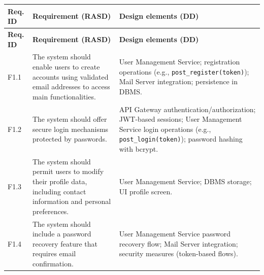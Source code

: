 \small
\begin{longtable}{|p{}|p{}|p{}|}
    \hline
    \textbf{Req. ID} & \textbf{Requirement (RASD)} & \textbf{Design elements (DD)} \\
    \hline
    \endfirsthead
    \hline
    \textbf{Req. ID} & \textbf{Requirement (RASD)} & \textbf{Design elements (DD)} \\
    \hline
    \endhead
    \hline
    \endfoot

    F1.1 & The system should enable users to create accounts using validated email addresses to access main functionalities. &
    User Management Service; registration operations (e.g., \texttt{post\_register(token)}); Mail Server integration; persistence in DBMS. \\
    \hline
    F1.2 & The system should offer secure login mechanisms protected by passwords. &
    API Gateway authentication/authorization; JWT-based sessions; User Management Service login operations (e.g., \texttt{post\_login(token)}); password hashing with bcrypt. \\
    \hline
    F1.3 & The system should permit users to modify their profile data, including contact information and personal preferences. &
    User Management Service; DBMS storage; UI profile screen. \\
    \hline
    F1.4 & The system should include a password recovery feature that requires email confirmation. &
    User Management Service password recovery flow; Mail Server integration; security measures (token-based flows). \\
    \hline


\end{longtable}
